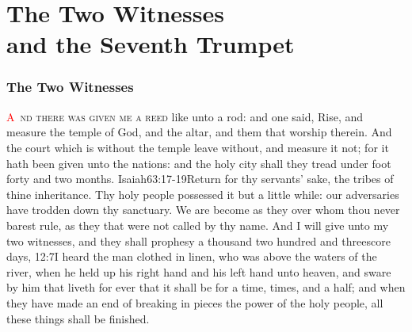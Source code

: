
\chapter{The Two Witnesses \\and the Seventh Trumpet}
\subsection*{The Two Witnesses}
\lettrine[lines=3,slope=0.5em]{\textcolor{red}{A}}{\ nd there was given me a reed} like unto a rod:%
 and one said, Rise, and measure the temple of God, and the altar, and them that worship therein. 
 And the court which is without the temple leave without, and measure it not; for it hath been given unto the nations: and the holy city shall they tread under foot forty and two months.%
					{Isaiah}{63:17-19}{Return for thy servants’ sake, the tribes of thine inheritance. Thy holy people possessed it but a little while: our adversaries have trodden down thy sanctuary. We are become as they over whom thou never barest rule, as they that were not called by thy name.} %
 And I will give unto my two witnesses, and they shall prophesy a thousand two hundred and threescore days,%
					{12:7}{I heard the man clothed in linen, who was above the waters of the river, when he held up his right hand and his left hand unto heaven, and sware by him that liveth for ever that it shall be for a time, times, and a half; and when they have made an end of breaking in pieces the power of the holy people, all these things shall be finished.}
